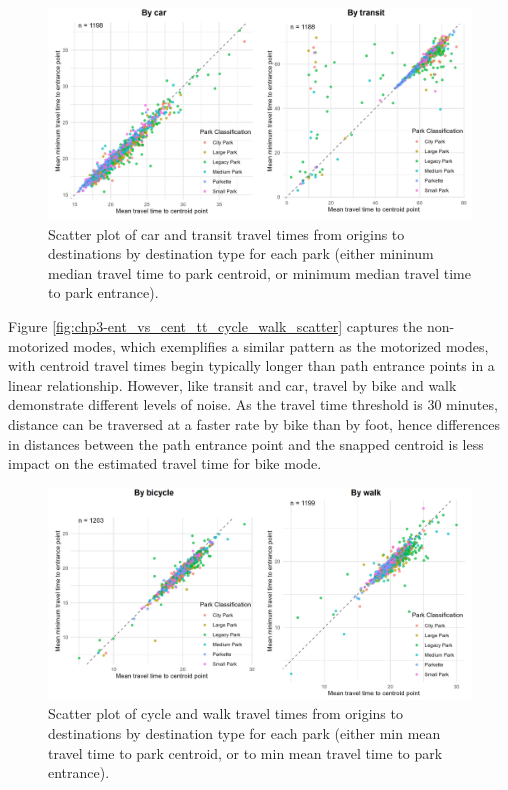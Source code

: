 \documentclass[
11pt, %
oneside, %
english, %
singlespacing, %
]{macthesis} %
\begin{document}
\begin{figure}

{\centering \includegraphics[width=6in]{./data/figures/chp3-ent_vs_cent_tt_transit_car_scatter} 

}

\caption{\label{fig:chp3-ent_vs_cent_tt_car_transit_scatter} Scatter plot of car and transit travel times from origins to destinations by destination type for each park (either mininum median travel time to park centroid, or minimum median travel time to park entrance). }\label{fig:unnamed-chunk-48}
\end{figure}

Figure \ref{fig:chp3-ent_vs_cent_tt_cycle_walk_scatter} captures the non-motorized modes, which exemplifies a similar pattern as the motorized modes, with centroid travel times begin typically longer than path entrance points in a linear relationship. However, like transit and car, travel by bike and walk demonstrate different levels of noise. As the travel time threshold is 30 minutes, distance can be traversed at a faster rate by bike than by foot, hence differences in distances between the path entrance point and the snapped centroid is less impact on the estimated travel time for bike mode.

\begin{figure}

{\centering \includegraphics[width=6in]{./data/figures/chp3-ent_vs_cent_tt_walk_cycle_scatter} 

}

\caption{\label{fig:chp3-ent_vs_cent_tt_cycle_walk_scatter}  Scatter plot of cycle and walk travel times from origins to destinations by destination type for each park (either min mean travel time to park centroid, or to min mean travel time to park entrance). }\label{fig:unnamed-chunk-49}
\end{figure}
\end{document}
